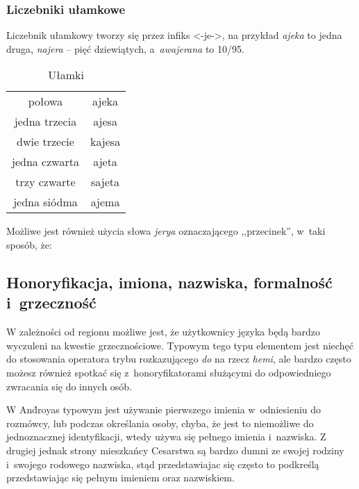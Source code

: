 \begin{spacing}{1.1}
\subsubsection{Liczebniki ułamkowe}

Liczebnik ułamkowy tworzy się przez infiks <-je->, na przykład \emph{ajeka} to
jedna druga, \emph{najera} -- pięć dziewiątych, a~\emph{awajerana} to 10/95.

\begin{table}[ht]
	\centering
	\caption{Ułamki}
	\begin{tabular}{cc} \toprule
		połowa & ajeka \\
		jedna trzecia & ajesa \\
		dwie trzecie & kajesa \\
		jedna czwarta & ajeta \\
		trzy czwarte & sajeta \\
		jedna siódma & ajema  \\\bottomrule
	\end{tabular}
	\label{tab:numerals4}
\end{table}

Możliwe jest również użycia słowa \emph{jerya} oznaczającego ,,przecinek'',
w~taki sposób, że:


\subsection{Honoryfikacja, imiona, nazwiska, formalność i~grzeczność}

W zależności od regionu możliwe jest, że użytkownicy języka będą bardzo
wyczuleni na kwestie grzecznościowe. Typowym tego typu elementem jest niechęć do
stosowania operatora trybu rozkazującego \emph{do} na rzecz \emph{hemi}, ale
bardzo często możesz również spotkać się z~honoryfikatorami służącymi do
odpowiedniego zwracania się do innych osób.

W And́royas typowym jest używanie pierwszego imienia w~odniesieniu do rozmówcy,
lub podczas określania osoby, chyba, że jest to niemożliwe do jednoznacznej
identyfikacji, wtedy używa się pełnego imienia i~nazwiska. Z drugiej jednak
strony mieszkańcy Cesarstwa są bardzo dumni ze swojej rodziny i~swojego rodowego
nazwiska, stąd przedstawiajac się często to podkreślą przedstawiając się pełnym
imieniem oraz nazwiskiem.



\end{spacing}
